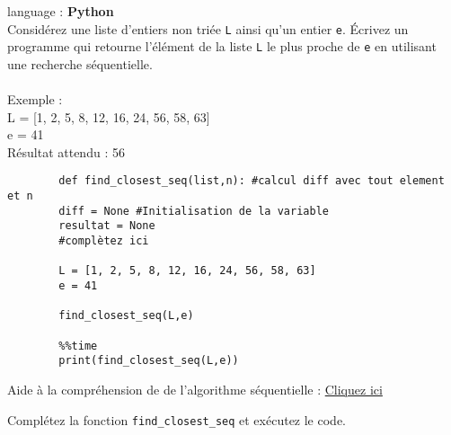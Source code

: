\begin{Exercice}[5 minutes] language : \textbf{Python}\\

Considérez une liste d’entiers non triée \lstinline{L} ainsi qu’un entier \lstinline{e}. Écrivez un programme qui retourne l'élément de la liste \lstinline{L} le plus proche de \lstinline{e} en utilisant une recherche séquentielle.\\\\
Exemple :\\
L = [1, 2, 5, 8, 12, 16, 24, 56, 58, 63] \\
e = 41\\
Résultat attendu : 56\\

    \begin{lstlisting}
        def find_closest_seq(list,n): #calcul diff avec tout element et n
        diff = None #Initialisation de la variable
        resultat = None
        #complètez ici
            
        L = [1, 2, 5, 8, 12, 16, 24, 56, 58, 63] 
        e = 41

        find_closest_seq(L,e)
        
        %%time 
        print(find_closest_seq(L,e))
    \end{lstlisting}

    \begin{conseil}
        Aide à la compréhension de de l'algorithme séquentielle : \href{https://runestone.academy/runestone/books/published/pythonds/SortSearch/TheSequentialSearch.html#lst-seqsearchpython}{Cliquez ici}
    \end{conseil}
    \begin{solution}
        Complétez la fonction \lstinline{find_closest_seq} et exécutez le code. 
    \end{solution}
\end{Exercice}

